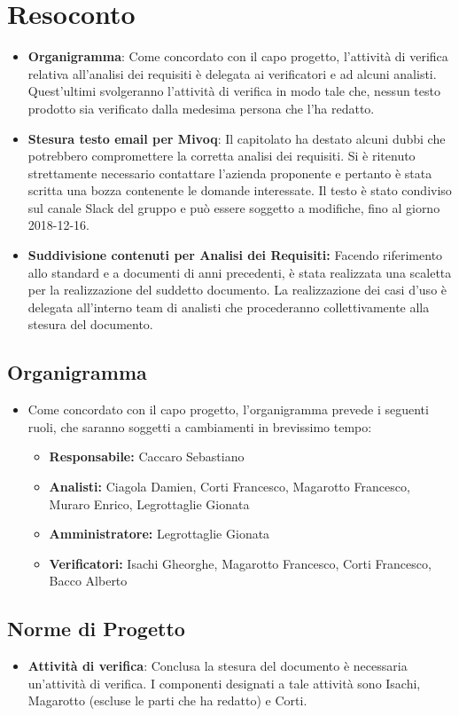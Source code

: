 \documentclass[a4paper, oneside, openany, dvipsnames, table]{article}
\begin{document}
\section{Resoconto}
\begin{itemize}
\item \textbf{Organigramma}: Come concordato con il capo progetto, l'attività di verifica relativa all'analisi dei requisiti è delegata ai verificatori e ad alcuni analisti. Quest'ultimi svolgeranno l'attività di verifica in modo tale che, nessun testo prodotto sia verificato dalla medesima persona che l'ha redatto. 
\item \textbf{Stesura testo email per Mivoq}: Il capitolato ha destato alcuni dubbi che potrebbero compromettere la corretta analisi dei requisiti. Si è ritenuto strettamente necessario contattare l'azienda proponente e pertanto è stata scritta una bozza contenente le domande interessate. Il testo è stato condiviso sul canale Slack del gruppo e può essere soggetto a modifiche, fino al giorno 2018-12-16.
\item \textbf{Suddivisione contenuti per Analisi dei Requisiti:} Facendo riferimento allo standard e a documenti di anni precedenti, è stata realizzata una scaletta per la realizzazione del suddetto documento.
La realizzazione dei casi d'uso è delegata all'interno team di analisti che procederanno collettivamente alla stesura del documento.
\end{itemize}
\subsection{Organigramma}
\begin{itemize}
\item Come concordato con il capo progetto, l'organigramma prevede i seguenti ruoli, che saranno soggetti a cambiamenti in brevissimo tempo:
	\begin{itemize}
	\item \textbf{Responsabile:} Caccaro Sebastiano
	\item \textbf{Analisti:} Ciagola Damien, Corti Francesco, Magarotto Francesco, Muraro Enrico, Legrottaglie Gionata
	\item \textbf{Amministratore:} Legrottaglie Gionata
	\item \textbf{Verificatori:} Isachi Gheorghe, Magarotto Francesco, Corti Francesco, Bacco Alberto
	\end{itemize}
\end{itemize}

\subsection{Norme di Progetto}
\begin{itemize}
\item \textbf{Attività di verifica}: Conclusa la stesura del documento è necessaria un'attività di verifica. I componenti designati a tale attività sono Isachi, Magarotto (escluse le parti che ha redatto) e Corti.
\end{itemize}
\end{document}
